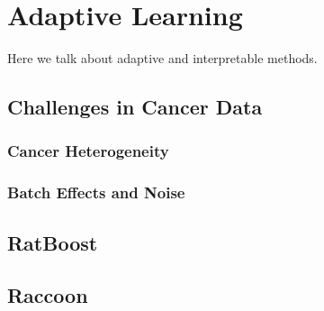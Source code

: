 \chapter{Adaptive Learning}

Here we talk about adaptive and interpretable methods.

\section{Challenges in Cancer Data}
\subsection{Cancer Heterogeneity}

\subsection{Batch Effects and Noise}

\section{RatBoost}

\section{Raccoon}
